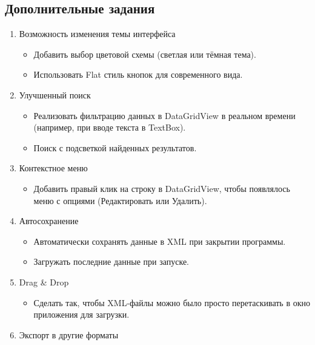 \documentclass[12pt]{article}
\newcommand{\icon}[1]{\fontspec{UbuntuNerdFont}[Extension = .ttf,
  Path = /nix/store/h721jafy2n74x4k5p0hxbz722h0rncmx-nerd-fonts-ubuntu-3.3.0+0.83/share/fonts/truetype/NerdFonts/Ubuntu/,
  UprightFont = *-Regular,
BoldFont = *-Bold] #1}
\newcommand{\iicon}[1]{{\icon{#1}}}
\renewcommand{\texttt}[1]{{\small\ttfamily #1}}
\numberwithin{listing}{section}
\numberwithin{figure}{section}
\begin{document}
\newpage
\begin{center}
	\subsection
	[Дополнительные задания~\texorpdfstring{\faLightbulb}{}]
	{Дополнительные задания~\texorpdfstring{\faLightbulb}{}\protect\footnotemark}
	\begin{minipage}{0.8\linewidth}
		\begin{enumerate}[noitemsep,topsep=0pt, left=0pt]
			\item[\faStar] Возможность изменения темы интерфейса
			      \begin{itemize}
				      \item Добавить выбор цветовой схемы (светлая или тёмная тема).
				      \item Использовать Flat стиль кнопок для современного вида.
			      \end{itemize}
			\item[\faSearch] Улучшенный поиск
			      \begin{itemize}
				      \item Реализовать фильтрацию данных в DataGridView в реальном времени (например, при вводе текста в TextBox).
				      \item Поиск с подсветкой найденных результатов.
			      \end{itemize}
			\item[\iicon{}] Контекстное меню
			      \begin{itemize}
				      \item Добавить правый клик на строку в \texttt{DataGridView}, чтобы появлялось меню с опциями (Редактировать или Удалить).
			      \end{itemize}
			\item[\iicon{}] Автосохранение
			      \begin{itemize}
				      \item Автоматически сохранять данные в XML при закрытии программы.
				      \item Загружать последние данные при запуске.
			      \end{itemize}
			\item[\iicon{}] Drag \& Drop
			      \begin{itemize}
				      \item Сделать так, чтобы XML-файлы можно было просто перетаскивать в окно приложения для загрузки.
			      \end{itemize}
			\item[\iicon{}] Экспорт в другие форматы

\end{enumerate}
\end{minipage}
\end{center}
\end{document}
